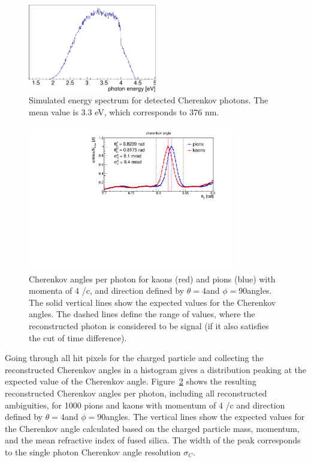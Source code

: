 \begin{figure}[!h]
\centering
\includegraphics[width=0.5\textwidth]{pics/lam.pdf}
\caption{\label{pic:lam}
Simulated energy spectrum for detected Cherenkov photons. The mean value is $3.3$ eV, which corresponds to $376$ nm.
}
\end{figure}

\begin{figure}[!h]
\centering
\includegraphics[clip, trim=0cm 0cm 0cm 0.7cm, width=0.8\textwidth]{pics/hAngle.pdf}
\caption{\label{pic:spr}
Cherenkov angles per photon for kaons (red) and pions (blue) with momenta of $4$ {\gev}/c, and direction defined by $\theta = 4$\mydeg and $\phi = 90$\mydeg angles. The solid vertical lines show the expected values for the Cherenkov angles. The dashed lines define the range of values, where the reconstructed photon is considered to be signal (if it also satisfies the cut of time difference). 
}
\end{figure}

Going through all hit pixels for the charged particle and collecting the reconstructed Cherenkov angles in a histogram gives a distribution peaking at the expected value of the Cherenkov angle. Figure~\ref{pic:spr} shows the resulting reconstructed Cherenkov angles per photon, including all reconstructed ambiguities, for 1000 pions and kaons with momentum of $4$ {\gev}/c and direction defined by $\theta = 4$\mydeg and $\phi = 90$\mydeg angles. The vertical lines show the expected values for the Cherenkov angle calculated based on the charged particle mass, momentum, and the mean refractive index of fused silica. The width of the peak corresponds to the single photon Cherenkov angle resolution $\sigma_{C}$.

